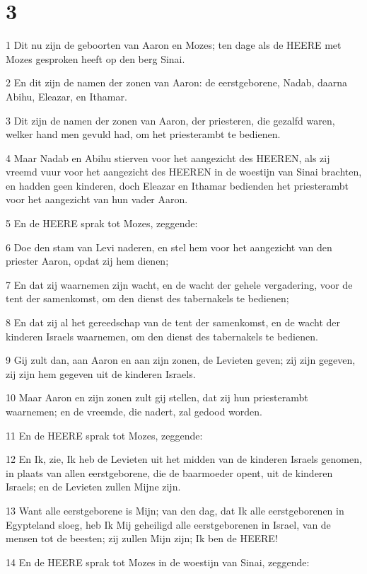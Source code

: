 \chapter{3}

\par 1 Dit nu zijn de geboorten van Aaron en Mozes; ten dage als de HEERE met Mozes gesproken heeft op den berg Sinai.
\par 2 En dit zijn de namen der zonen van Aaron: de eerstgeborene, Nadab, daarna Abihu, Eleazar, en Ithamar.
\par 3 Dit zijn de namen der zonen van Aaron, der priesteren, die gezalfd waren, welker hand men gevuld had, om het priesterambt te bedienen.
\par 4 Maar Nadab en Abihu stierven voor het aangezicht des HEEREN, als zij vreemd vuur voor het aangezicht des HEEREN in de woestijn van Sinai brachten, en hadden geen kinderen, doch Eleazar en Ithamar bedienden het priesterambt voor het aangezicht van hun vader Aaron.
\par 5 En de HEERE sprak tot Mozes, zeggende:
\par 6 Doe den stam van Levi naderen, en stel hem voor het aangezicht van den priester Aaron, opdat zij hem dienen;
\par 7 En dat zij waarnemen zijn wacht, en de wacht der gehele vergadering, voor de tent der samenkomst, om den dienst des tabernakels te bedienen;
\par 8 En dat zij al het gereedschap van de tent der samenkomst, en de wacht der kinderen Israels waarnemen, om den dienst des tabernakels te bedienen.
\par 9 Gij zult dan, aan Aaron en aan zijn zonen, de Levieten geven; zij zijn gegeven, zij zijn hem gegeven uit de kinderen Israels.
\par 10 Maar Aaron en zijn zonen zult gij stellen, dat zij hun priesterambt waarnemen; en de vreemde, die nadert, zal gedood worden.
\par 11 En de HEERE sprak tot Mozes, zeggende:
\par 12 En Ik, zie, Ik heb de Levieten uit het midden van de kinderen Israels genomen, in plaats van allen eerstgeborene, die de baarmoeder opent, uit de kinderen Israels; en de Levieten zullen Mijne zijn.
\par 13 Want alle eerstgeborene is Mijn; van den dag, dat Ik alle eerstgeborenen in Egypteland sloeg, heb Ik Mij geheiligd alle eerstgeborenen in Israel, van de mensen tot de beesten; zij zullen Mijn zijn; Ik ben de HEERE!
\par 14 En de HEERE sprak tot Mozes in de woestijn van Sinai, zeggende:
